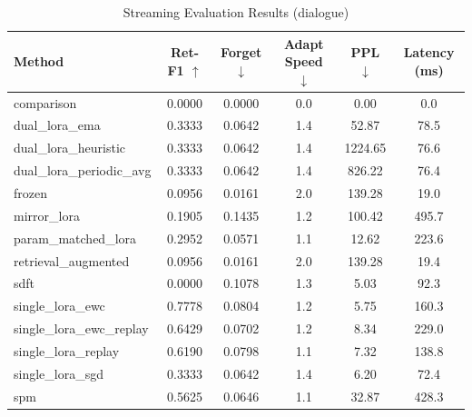 \begin{table}[h]
\centering
\caption{Streaming Evaluation Results (dialogue)}
\begin{tabular}{lccccc}
\toprule
Method & Ret-F1 $\uparrow$ & Forget $\downarrow$ & Adapt Speed $\downarrow$ & PPL $\downarrow$ & Latency (ms) \\
\midrule
comparison & 0.0000 & 0.0000 & 0.0 & 0.00 & 0.0 \\
dual_lora_ema & 0.3333 & 0.0642 & 1.4 & 52.87 & 78.5 \\
dual_lora_heuristic & 0.3333 & 0.0642 & 1.4 & 1224.65 & 76.6 \\
dual_lora_periodic_avg & 0.3333 & 0.0642 & 1.4 & 826.22 & 76.4 \\
frozen & 0.0956 & 0.0161 & 2.0 & 139.28 & 19.0 \\
mirror_lora & 0.1905 & 0.1435 & 1.2 & 100.42 & 495.7 \\
param_matched_lora & 0.2952 & 0.0571 & 1.1 & 12.62 & 223.6 \\
retrieval_augmented & 0.0956 & 0.0161 & 2.0 & 139.28 & 19.4 \\
sdft & 0.0000 & 0.1078 & 1.3 & 5.03 & 92.3 \\
single_lora_ewc & 0.7778 & 0.0804 & 1.2 & 5.75 & 160.3 \\
single_lora_ewc_replay & 0.6429 & 0.0702 & 1.2 & 8.34 & 229.0 \\
single_lora_replay & 0.6190 & 0.0798 & 1.1 & 7.32 & 138.8 \\
single_lora_sgd & 0.3333 & 0.0642 & 1.4 & 6.20 & 72.4 \\
spm & 0.5625 & 0.0646 & 1.1 & 32.87 & 428.3 \\
\bottomrule
\end{tabular}
\end{table}